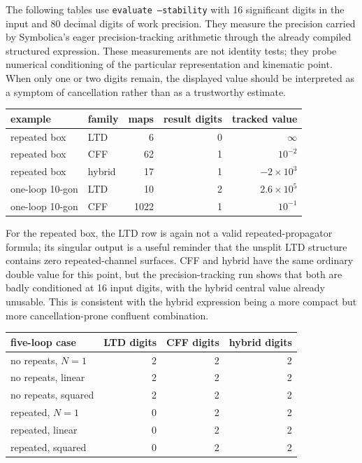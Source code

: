 \documentclass[11pt,a4paper]{report}
\begin{document}
The following tables use \texttt{evaluate --stability} with 16 significant
digits in the input and 80 decimal digits of work precision.  They measure the
precision carried by Symbolica's eager precision-tracking arithmetic through the
already compiled structured expression.  These measurements are not identity
tests; they probe numerical conditioning of the particular representation and
kinematic point.  When only one or two digits remain, the displayed value should
be interpreted as a symptom of cancellation rather than as a trustworthy
estimate.

\begin{center}
\begin{tabular}{llrrr}
\toprule
example & family & maps & result digits & tracked value \\
\midrule
repeated box & LTD & 6 & 0 & \(\infty\) \\
repeated box & CFF & 62 & 1 & \(10^{-2}\) \\
repeated box & hybrid & 17 & 1 & \(-2\times 10^{3}\) \\
one-loop 10-gon & LTD & 10 & 2 & \(2.6\times 10^{5}\) \\
one-loop 10-gon & CFF & 1022 & 1 & \(10^{-1}\) \\
\bottomrule
\end{tabular}
\end{center}

For the repeated box, the LTD row is again not a valid repeated-propagator
formula; its singular output is a useful reminder that the unsplit LTD
structure contains zero repeated-channel surfaces.  CFF and hybrid have the
same ordinary double value for this point, but the precision-tracking run shows
that both are badly conditioned at 16 input digits, with the hybrid central
value already unusable.  This is consistent with the hybrid expression being a
more compact but more cancellation-prone confluent combination.

\begin{center}
\begin{tabular}{lrrr}
\toprule
five-loop case & LTD digits & CFF digits & hybrid digits \\
\midrule
no repeats, \(N=1\) & 2 & 2 & 2 \\
no repeats, linear & 2 & 2 & 2 \\
no repeats, squared & 2 & 2 & 2 \\
repeated, \(N=1\) & 0 & 2 & 2 \\
repeated, linear & 0 & 2 & 2 \\
repeated, squared & 0 & 2 & 2 \\
\bottomrule
\end{tabular}
\end{center}
\end{document}
